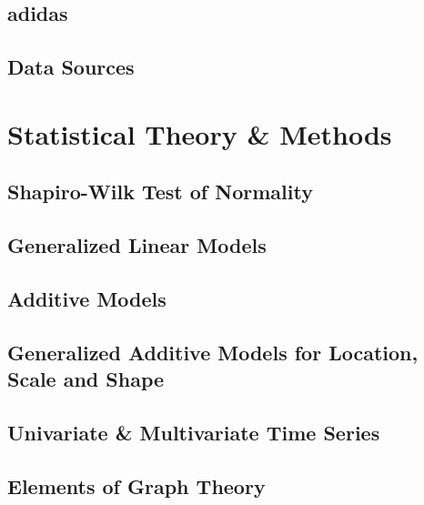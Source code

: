 \documentclass[11pt, twoside]{article}
\numberwithin{equation}{section}
\numberwithin{table}{section}
\numberwithin{figure}{section}
\begin{document}
\subsection{adidas} \label{ssec:adidas}

\subsection{Data Sources} \label{ssec:data_sources}

%
\newpage
\thispagestyle{empty}
\cleardoublepage

\thispagestyle{plain}
\section{Statistical Theory \& Methods} \label{sec:theory_and_methods}

\subsection{Shapiro-Wilk Test of Normality} \label{ssec:shapiro_wilk}

\subsection{Generalized Linear Models} \label{ssec:glm}

%
\subsection{Additive Models} \label{ssec:gam}

\subsection{Generalized Additive Models for Location, Scale and Shape} \label{ssec:gamlss}

\subsection{Univariate \& Multivariate Time Series} \label{ssec:time_series}

\subsection{Elements of Graph Theory} \label{ssec:graph_theory}

\end{document}
